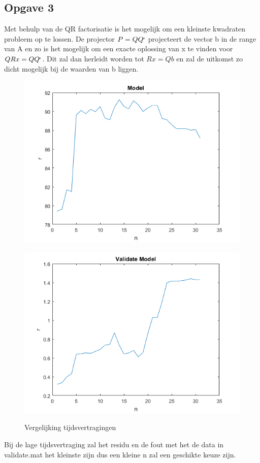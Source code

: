 \documentclass{Numerieke}
\newcommand\inv[1]{#1\raisebox{0.8ex}{$\scriptscriptstyle\!*$}}
\begin{document}
\subsection{Opgave 3}
Met behulp van de QR factorisatie is het mogelijk om een kleinste kwadraten probleem op te lossen. De projector \(P=Q\inv{Q}\) projecteert de vector b in de range van A en zo is het mogelijk om een exacte oplossing van x te vinden voor \(QRx=Q\inv{Q}\). Dit zal dan herleidt worden tot \(Rx=Qb\) en zal de uitkomst zo dicht mogelijk bij de waarden van b liggen. 
\begin{figure}[H]
	\centering
	\caption{Vergelijking tijdsvertragingen}
	\begin{minipage}[l]{.3\textwidth}
		\centering
		\includegraphics[width=1.1\linewidth]{Model_opgave3}
		\label{fig:test1}
	\end{minipage}%
	\begin{minipage}[r]{.3\textwidth}
		\centering
		\includegraphics[width=1.1\linewidth]{Validate_model_opgave3}
		\label{fig:test2}
	\end{minipage}
\end{figure}
Bij de lage tijdsvertraging zal het residu en de fout met het de data in validate.mat het kleinste zijn dus een kleine n zal een geschikte keuze zijn.
\end{document}
